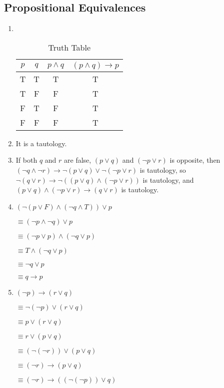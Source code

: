 \documentclass{sig-alternate-05-2015}
\begin{document}
\subsection{Propositional Equivalences}
\begin{enumerate}
\item {\ }
\begin{table}[htb]
	\centering
	\caption{Truth Table}
	\begin{tabular}{cccc} \toprule
		$p$ & $q$ & $p \wedge q$ & $(p \wedge q) \rightarrow p$\\ \midrule
		T & T & T & T\\ 
		T & F & F & T\\
		F & T & F & T\\
		F & F & F & T\\
		\hline\end{tabular}
\end{table}


\item It is a tautology.

\item If both $q$ and $r$ are false, $(p \vee q)$ and $(\neg p \vee r)$ is opposite, then $(\neg q \wedge \neg r) \rightarrow \neg (p \vee q) \vee \neg (\neg p \vee r)$ is tautology, so $\neg(q \vee r) \rightarrow \neg ((p \vee q) \wedge (\neg p \vee r))$ is tautology, and $(p \vee q) \wedge (\neg p \vee r) \rightarrow (q \vee r)$ is tautology.

\item  $(\neg(p \vee F) \wedge (\neg q \wedge T)) \vee p$

$\equiv (\neg p \wedge \neg q)\vee p$

$\equiv (\neg p\vee p) \wedge (\neg q \vee p)$

 $\equiv T \wedge (\neg q \vee p)$

 $\equiv \neg q \vee p$
  
  $\equiv  q \rightarrow p$
 
 \item $ (\neg p) \rightarrow (r\vee q)$
 
 $\equiv  \neg(\neg p) \vee (r\vee q)$

$\equiv  p \vee (r\vee q)$

$\equiv  r \vee (p\vee q)$

$\equiv  (\neg(\neg r)) \vee (p\vee q)$

$\equiv  (\neg r)\rightarrow (p\vee q)$

$\equiv  (\neg r)\rightarrow ((\neg(\neg p))\vee q)$


\end{enumerate}
\end{document}
